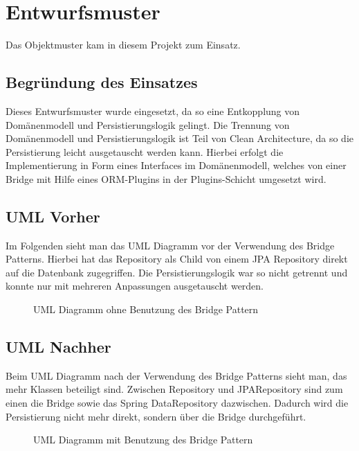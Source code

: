 
\chapter{Entwurfsmuster}
Das Objektmuster  kam in diesem Projekt zum Einsatz. 

\section{Begründung des Einsatzes}
Dieses Entwurfsmuster wurde eingesetzt, da so eine Entkopplung von Domänenmodell und Persistierungslogik gelingt. Die Trennung von Domänenmodell und Persistierungslogik ist Teil von Clean Architecture, da so die Persistierung leicht ausgetauscht werden kann. Hierbei erfolgt die Implementierung in Form eines Interfaces im Domänenmodell, welches von einer Bridge mit Hilfe eines ORM-Plugins in der Plugins-Schicht umgesetzt wird.

\section{\ac{UML} Vorher}
Im Folgenden sieht man das \ac{UML} Diagramm vor der Verwendung des Bridge Patterns. Hierbei hat das Repository als Child von einem JPA Repository direkt auf die Datenbank zugegriffen. Die Persistierungslogik war so nicht getrennt und konnte nur mit mehreren Anpassungen ausgetauscht werden.

        \begin{figure}[H]
	        \centering
	        \caption{UML Diagramm ohne Benutzung des Bridge Pattern}
        \end{figure}

\section{\ac{UML} Nachher}
Beim \ac{UML} Diagramm nach der Verwendung des Bridge Patterns sieht man, das mehr Klassen beteiligt sind. Zwischen Repository und JPARepository sind zum einen die Bridge sowie das Spring DataRepository dazwischen. Dadurch wird die Persistierung nicht mehr direkt, sondern über die Bridge durchgeführt.

        \begin{figure}[H]
	        \centering
	        \caption{UML Diagramm mit Benutzung des Bridge Pattern}
        \end{figure}